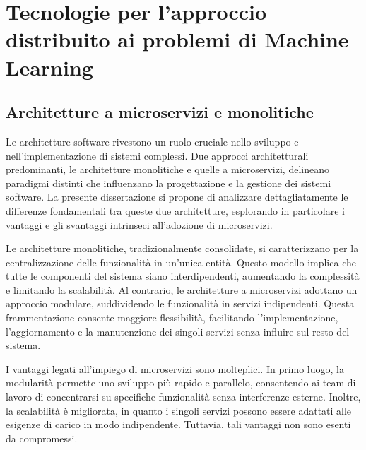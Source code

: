 % 
% 
% 



\clearpage
\cleardoublepage

\chapter{Tecnologie per l'approccio distribuito ai problemi di Machine Learning}

\section{Architetture a microservizi e monolitiche}

Le architetture software rivestono un ruolo cruciale nello sviluppo e nell'implementazione di sistemi complessi. Due approcci architetturali predominanti, le architetture monolitiche e quelle a microservizi, delineano paradigmi distinti che influenzano la progettazione e la gestione dei sistemi software. La presente dissertazione si propone di analizzare dettagliatamente le differenze fondamentali tra queste due architetture, esplorando in particolare i vantaggi e gli svantaggi intrinseci all'adozione di microservizi.


Le architetture monolitiche, tradizionalmente consolidate, si caratterizzano per la centralizzazione delle funzionalità in un'unica entità. Questo modello implica che tutte le componenti del sistema siano interdipendenti, aumentando la complessità e limitando la scalabilità. Al contrario, le architetture a microservizi adottano un approccio modulare, suddividendo le funzionalità in servizi indipendenti. Questa frammentazione consente maggiore flessibilità, facilitando l'implementazione, l'aggiornamento e la manutenzione dei singoli servizi senza influire sul resto del sistema.

I vantaggi legati all'impiego di microservizi sono molteplici. In primo luogo, la modularità permette uno sviluppo più rapido e parallelo, consentendo ai team di lavoro di concentrarsi su specifiche funzionalità senza interferenze esterne. Inoltre, la scalabilità è migliorata, in quanto i singoli servizi possono essere adattati alle esigenze di carico in modo indipendente. Tuttavia, tali vantaggi non sono esenti da compromessi.

